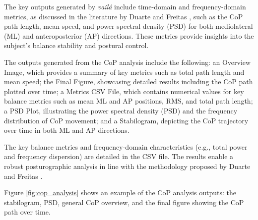 \documentclass{article}
\begin{document}
The key outputs generated by \textit{vailá} include time-domain and frequency-domain metrics, as discussed in the literature by Duarte and Freitas \citep{duarte2010revision}, such as the CoP path length, mean speed, and power spectral density (PSD) for both mediolateral (ML) and anteroposterior (AP) directions. These metrics provide insights into the subject's balance stability and postural control.

The outputs generated from the CoP analysis include the following: an Overview Image, which provides a summary of key metrics such as total path length and mean speed; the Final Figure, showcasing detailed results including the CoP path plotted over time; a Metrics CSV File, which contains numerical values for key balance metrics such as mean ML and AP positions, RMS, and total path length; a PSD Plot, illustrating the power spectral density (PSD) and the frequency distribution of CoP movement; and a Stabilogram, depicting the CoP trajectory over time in both ML and AP directions.

The key balance metrics and frequency-domain characteristics (e.g., total power and frequency dispersion) are detailed in the CSV file. The results enable a robust posturographic analysis in line with the methodology proposed by Duarte and Freitas \citep{duarte2010revision}.

Figure \ref{fig:cop_analysis} shows an example of the CoP analysis outputs: the stabilogram, PSD, general CoP overview, and the final figure showing the CoP path over time.
\end{document}
